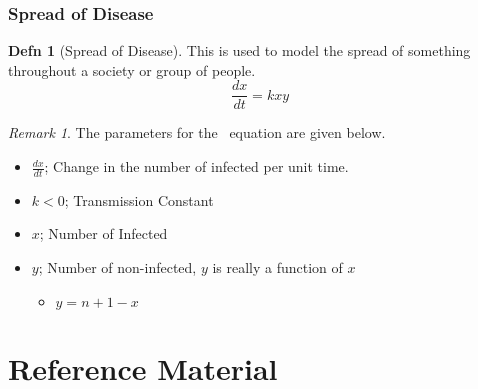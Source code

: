 \documentclass[10pt,letterpaper,final,twoside,notitlepage]{article}
\theoremstyle{plain}
\theoremstyle{definition}
\newtheorem{definition}{Defn}
\theoremstyle{remark}
\newtheorem{remark}{Remark}[definition]
\begin{document}
		\subsubsection{Spread of Disease} \label{subsubsec:Spread of Disease}
			\begin{definition}[Spread of Disease] \label{def:Spread of Disease}
				This is used to model the spread of something throughout a society or group of people.
				\begin{equation} \label{eq:Spread of Disease}
					\frac{dx}{dt} = kxy
				\end{equation}
				\begin{remark}
					The parameters for the ~equation are given below.
					\begin{itemize}[noitemsep, nolistsep]
						\item $\frac{dx}{dt}$; Change in the number of infected per unit time.
						\item $k<0$; Transmission Constant
						\item$x$; Number of Infected
						\item $y$; Number of non-infected, $y$ is really a function of $x$
						\begin{itemize}[noitemsep, nolistsep]
							\item $y = n+1-x$
						\end{itemize}
					\end{itemize}
				\end{remark}
			\end{definition}

\clearpage
\appendix
{}

\section{Reference Material} \label{sec:Reference Material}


\end{document}
